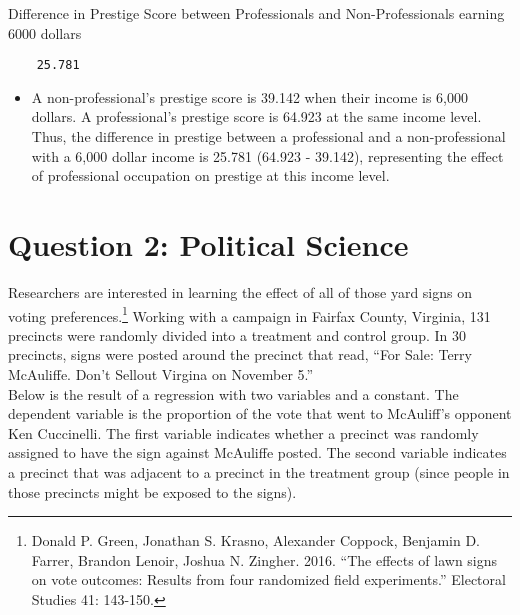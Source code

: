 \documentclass[12pt,letterpaper]{article}
\begin{document}
\noindent Difference in Prestige Score between Professionals and Non-Professionals earning 6000 dollars

\begin{verbatim}
	25.781
\end{verbatim}

\begin{itemize}[left=0pt]
	\item 
	A non-professional's prestige score is 39.142 when their income is 6,000 dollars. A professional's prestige score is 64.923 at the same income level. Thus, the difference in prestige between a professional and a non-professional with a 6,000 dollar income is 25.781 (64.923 - 39.142), representing the effect of professional occupation on prestige at this income level.
\end{itemize}
\newpage

\section*{Question 2: Political Science}
\vspace{.2cm}
\noindent 	Researchers are interested in learning the effect of all of those yard signs on voting preferences.\footnote{Donald P. Green, Jonathan	S. Krasno, Alexander Coppock, Benjamin D. Farrer,	Brandon Lenoir, Joshua N. Zingher. 2016. ``The effects of lawn signs on vote outcomes: Results from four randomized field experiments.'' Electoral Studies 41: 143-150. } Working with a campaign in Fairfax County, Virginia, 131 precincts were randomly divided into a treatment and control group. In 30 precincts, signs were posted around the precinct that read, ``For Sale: Terry McAuliffe. Don't Sellout Virgina on November 5.'' \\

Below is the result of a regression with two variables and a constant.  The dependent variable is the proportion of the vote that went to McAuliff's opponent Ken Cuccinelli. The first variable indicates whether a precinct was randomly assigned to have the sign against McAuliffe posted. The second variable indicates
a precinct that was adjacent to a precinct in the treatment group (since people in those precincts might be exposed to the signs).  \\
\end{document}

